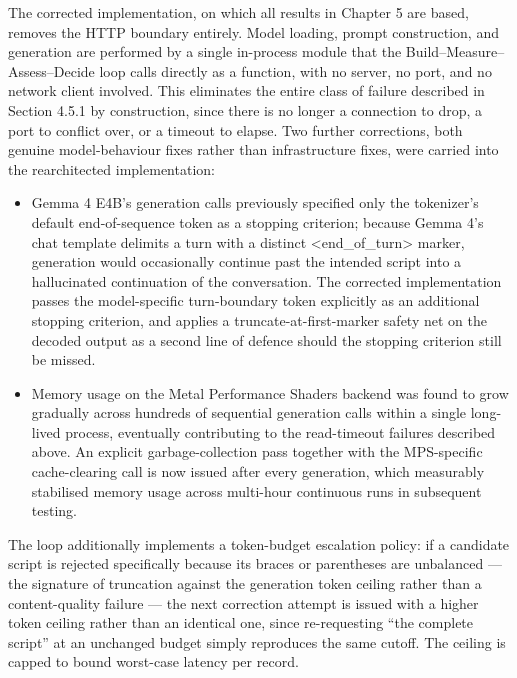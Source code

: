 The corrected implementation, on which all results in Chapter 5 are
based, removes the HTTP boundary entirely. Model loading, prompt
construction, and generation are performed by a single in-process module
that the Build--Measure--Assess--Decide loop calls directly as a
function, with no server, no port, and no network client involved. This
eliminates the entire class of failure described in Section 4.5.1 by
construction, since there is no longer a connection to drop, a port to
conflict over, or a timeout to elapse. Two further corrections, both
genuine model-behaviour fixes rather than infrastructure fixes, were
carried into the rearchitected implementation:

\begin{itemize}
\item
  Gemma 4 E4B's generation calls previously specified only the
  tokenizer's default end-of-sequence token as a stopping criterion;
  because Gemma 4's chat template delimits a turn with a distinct
  \textless end\_of\_turn\textgreater{} marker, generation would
  occasionally continue past the intended script into a hallucinated
  continuation of the conversation. The corrected implementation passes
  the model-specific turn-boundary token explicitly as an additional
  stopping criterion, and applies a truncate-at-first-marker safety net
  on the decoded output as a second line of defence should the stopping
  criterion still be missed.
\item
  Memory usage on the Metal Performance Shaders backend was found to
  grow gradually across hundreds of sequential generation calls within a
  single long-lived process, eventually contributing to the read-timeout
  failures described above. An explicit garbage-collection pass together
  with the MPS-specific cache-clearing call is now issued after every
  generation, which measurably stabilised memory usage across multi-hour
  continuous runs in subsequent testing.
\end{itemize}

The loop additionally implements a token-budget escalation policy: if a
candidate script is rejected specifically because its braces or
parentheses are unbalanced --- the signature of truncation against the
generation token ceiling rather than a content-quality failure --- the
next correction attempt is issued with a higher token ceiling rather
than an identical one, since re-requesting ``the complete script'' at an
unchanged budget simply reproduces the same cutoff. The ceiling is
capped to bound worst-case latency per record.

